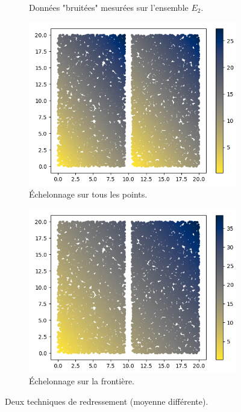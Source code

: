 \documentclass[12pt]{article}
\begin{document}
\begin{figure}[ht!]
\begin{subfigure}[b]{0.475\textwidth}
            {{\small Données "bruitées" mesurées sur l'ensemble $E_2$.}}    
        \end{subfigure}
        \centering
        \begin{subfigure}[b]{0.475\textwidth}
            \centering
            \includegraphics[width=\textwidth]{Images/Frontiere_int_full.png}
            \caption[]%
            {{ \small Échelonnage sur tous les points.}}    
        \end{subfigure}
        \hfill
        \begin{subfigure}[b]{0.475\textwidth}  
            \centering 
            \includegraphics[width=\textwidth]{Images/Frontiere_int_final.png}
            \caption[]%
            {{\small Échelonnage sur la frontière.}}    
        \end{subfigure}
        \caption{Deux techniques de redressement (moyenne différente).}
    \end{figure}
\end{document}
